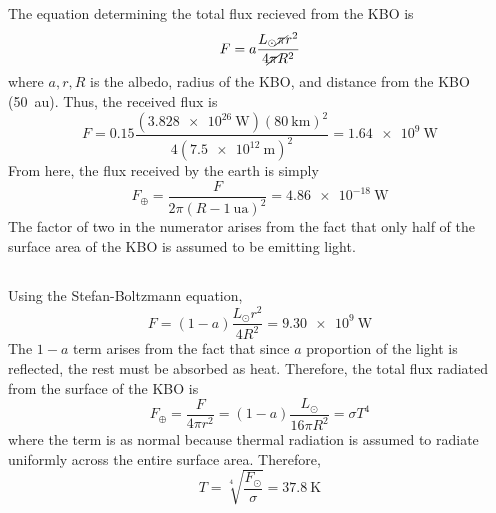 \documentclass{article}
\begin{document}
\subsection{}

The equation determining the total flux recieved from the KBO is
\begin{equation}
    F = a \frac{L_\odot \cancel{\pi} r^2}{4 \cancel{\pi} R^2}
\end{equation}
where \(a, r, R\) is the albedo, radius of the KBO, and distance from the KBO (\SI{50}{\astronomicalunit}).
Thus, the received flux is
\begin{equation} \label{eq:3a}
    F = 0.15 \frac{(\SI{3.828e+26}{\watt}) (\SI{80}{\kilo\meter})^2}{4 (\SI{7.5e+12}{\meter})^2} = \SI{1.64e+9}{\watt}
\end{equation}
From here, the flux received by the earth is simply
\begin{equation}
    F_\oplus = \frac{F}{2 \pi (R - \SI{1}{\astronomicalunit})^2} = \SI{4.86e-18}{\watt}
\end{equation}
The factor of two in the numerator arises from the fact that only half of the surface area of the KBO is assumed to be emitting light.

\subsection{}

Using the Stefan-Boltzmann equation,
\begin{equation}
    F = (1 - a) \frac{L_\odot r^2}{4 R^2} = \SI{9.30e+9}{\watt}
\end{equation}
The \(1 - a\) term arises from the fact that since \(a\) proportion of the light is reflected, the rest must be absorbed as heat.
Therefore, the total flux radiated from the surface of the KBO is
\begin{equation}
    F_\oplus = \frac{F}{4 \pi r^2} = (1 - a) \frac{L_\odot}{16 \pi R^2} = \sigma T^4
\end{equation}
where the term is as normal because thermal radiation is assumed to radiate uniformly across the entire surface area.
Therefore,
\begin{equation}
    T = \sqrt[4]{\frac{F_\odot}{\sigma}} = \SI{37.8}{\kelvin}
\end{equation}

\subsection{}
\end{document}
